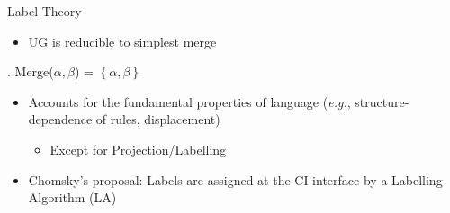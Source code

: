\documentclass[Proposal]{subfiles}
\begin{document}
\begin{frame}
  {Label Theory}
  {\textcite{chomsky2013problems,chomsky2015problems}}
  \begin{itemize}
    \item UG is reducible to simplest merge
  \end{itemize}
  \ex. Merge($\alpha,\beta$) = $\left\{ \alpha,\beta \right\}$

  \begin{itemize}
    \item Accounts for the fundamental properties of language (\textit{e.g.}, structure-dependence of rules, displacement)
      \begin{itemize}
	\item Except for Projection/Labelling
      \end{itemize}
    \item Chomsky's proposal: Labels are assigned at the CI interface by a Labelling Algorithm (LA)
  \end{itemize}
\end{frame}
\end{document}
